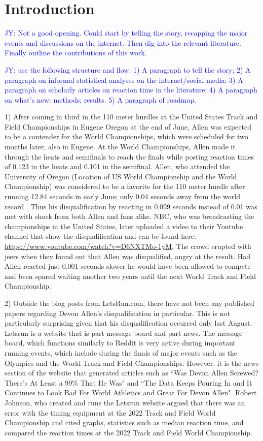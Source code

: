 \documentclass[12pt, letterpaper, titlepage]{article}
\newcommand{\jy}[1]{\textcolor{blue}{JY: #1}}
\begin{document}
\section{Introduction}
\label{sec:intro}


\jy{Not a good opening. Could start by telling the story, recapping the major
  events and discussions on the internet. Then dig into the relevant
  literature. Finally outline the contributions of this work.
}


\jy{use the following structure and flow:
  1) A paragraph to tell the story;
  2) A paragraph on informal statistical analyses on the internet/social media;
  3) A paragraph on scholarly articles on reaction time in the literature;
  4) A paragraph on what's new: methods; results.
  5) A paragraph of roadmap.}


1)
After coming in third in the 110 meter hurdles at the United States Track and 
Field Championships in Eugene Oregon at the end of June, Allen was expected to 
be a contender for the World Championships, which were scheduled for two months 
later, also in Eugene. At the World Championships, Allen made it through the 
heats and semifinals to reach the finals while posting reaction times of 0.123
in the heats and 0.101 in the semifinal.  Allen, who attended the University
of Oregon (Location of US World Championship and the World Championship) was
considered to be a favorite for the 110 meter hurdle after running 12.84 seconds
in early June; only 0.04 seconds away from the world record \citep{Preview}.
Thus his disqualification by reacting in 0.099 seconds instead of 0.01 was met
with shock from both Allen and fans alike.  NBC, who was broadcasting the
championships in the United States, later uploaded a video to their Youtube
channel that show the disqualification and can be found here:
\url{https://www.youtube.com/watch?v=D6NXTMo-1yM}. The crowd erupted with jeers when
they found out that Allen was disqualified, angry at the result.  Had Allen 
reacted just 0.001 seconds slower he would have been allowed to compete and been 
spared waiting another two years until the next World Track and Field Championship.

2)
Outside the blog posts from LetsRun.com, there have not been any published
papers regarding Devon Allen's disqualification in particular.  This is not
particularly surprising given that his disqualification occurred only last August.
Letsrun is a website that is part message board and part news.  The message board,
which functions similarly to Reddit is very active during important running
events, which include during the finals of major events such as
the Olympics and the World Track and Field Championships.  However, it is the
news section of the website that generated articles such as ``Was Devon Allen
Screwed? There's At Least a 99\% That He Was" and ``The Data Keeps Pouring In and
It Continues to Look Bad For World Athletics and Great For Devon Allen".  Robert
Johnson, who created and runs the Letsrun website argued that there was an error
with the timing equipment at the 2022 Track and Field World Championship and
cited graphs, statistics such as median reaction time, and compared the reaction
times at the 2022 Track and Field World Championship.  
\end{document}
